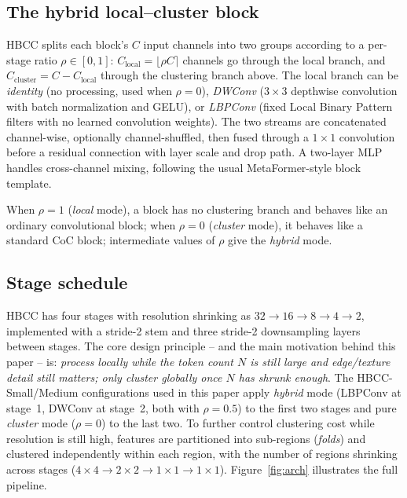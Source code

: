 \documentclass[journal]{IEEEtran}
\begin{document}
\subsection{The hybrid local--cluster block}

HBCC splits each block's $C$ input channels into two groups according to a per-stage ratio $\rho \in [0,1]$: $C_{\text{local}} = \lfloor \rho C \rceil$ channels go through the local branch, and $C_{\text{cluster}} = C - C_{\text{local}}$ through the clustering branch above. The local branch can be \textit{identity} (no processing, used when $\rho=0$), \textit{DWConv} ($3\times3$ depthwise convolution with batch normalization and GELU), or \textit{LBPConv} (fixed Local Binary Pattern filters with no learned convolution weights). The two streams are concatenated channel-wise, optionally channel-shuffled, then fused through a $1\times1$ convolution before a residual connection with layer scale and drop path. A two-layer MLP handles cross-channel mixing, following the usual MetaFormer-style block template.

When $\rho=1$ (\textit{local} mode), a block has no clustering branch and behaves like an ordinary convolutional block; when $\rho=0$ (\textit{cluster} mode), it behaves like a standard CoC block; intermediate values of $\rho$ give the \textit{hybrid} mode.

\subsection{Stage schedule}

HBCC has four stages with resolution shrinking as $32 \!\to\! 16 \!\to\! 8 \!\to\! 4 \!\to\! 2$, implemented with a stride-2 stem and three stride-2 downsampling layers between stages. The core design principle -- and the main motivation behind this paper -- is: \emph{process locally while the token count $N$ is still large and edge/texture detail still matters; only cluster globally once $N$ has shrunk enough}. The HBCC-Small/Medium configurations used in this paper apply \textit{hybrid} mode (LBPConv at stage~1, DWConv at stage~2, both with $\rho=0.5$) to the first two stages and pure \textit{cluster} mode ($\rho=0$) to the last two. To further control clustering cost while resolution is still high, features are partitioned into sub-regions (\textit{folds}) and clustered independently within each region, with the number of regions shrinking across stages ($4\times4 \to 2\times2 \to 1\times1 \to 1\times1$). Figure~\ref{fig:arch} illustrates the full pipeline.
\end{document}
